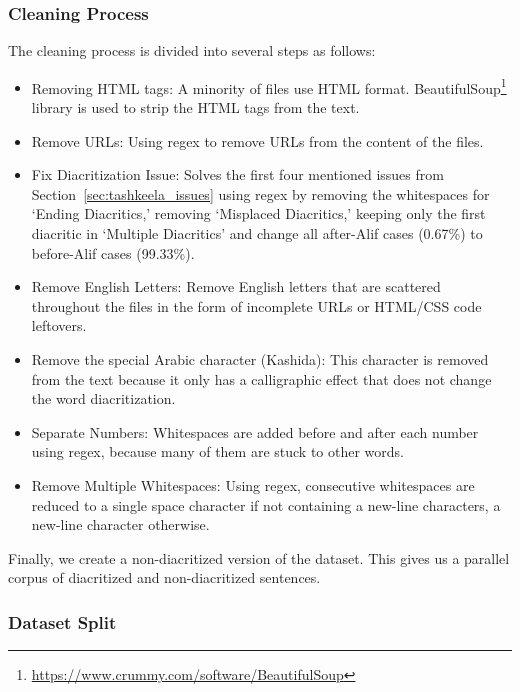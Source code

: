 \documentclass[conference]{IEEEtran}
\begin{document}
\subsubsection{Cleaning Process}
The cleaning process is divided into several steps as follows:
\begin{itemize}
\item Removing HTML tags: A minority of files use HTML format. BeautifulSoup\footnote{\url{https://www.crummy.com/software/BeautifulSoup}} library is used to strip the HTML tags from the text.

\item Remove URLs: Using regex to remove URLs from the content of the files.

\item Fix Diacritization Issue: Solves the first four mentioned issues from Section~\ref{sec:tashkeela_issues} using regex by removing the whitespaces for `Ending Diacritics,' removing `Misplaced Diacritics,' keeping only the first diacritic in `Multiple Diacritics' and change all after-Alif cases (0.67\%) to before-Alif cases (99.33\%).

\item Remove English Letters: Remove English letters that are scattered throughout the files in the form of incomplete URLs or HTML/CSS code leftovers.

\item Remove the special Arabic character (Kashida): This character is removed from the text because it only has a calligraphic effect that does not change the word diacritization.

\item Separate Numbers: Whitespaces are added before and after each number using regex, because many of them are stuck to other words.



\item Remove Multiple Whitespaces: Using regex, consecutive whitespaces are reduced to a single space character if not containing a new-line characters, a new-line character otherwise.

\end{itemize}

Finally, we create a non-diacritized version of the dataset. This gives us a parallel corpus of diacritized and non-diacritized sentences.

\subsubsection{Dataset Split}
\end{document}
